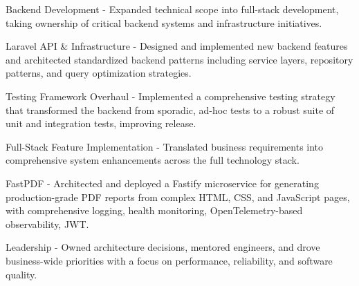 \begin{cventries}
{\begin{cvsubitems}
        \end{cvsubitems}
        \begin{cvitems} %
            \item {Backend Development - Expanded technical scope into full-stack development, taking ownership of critical backend systems and infrastructure initiatives.}
        \end{cvitems}
        \begin{cvsubitems}
            \item {Laravel API \& Infrastructure - Designed and implemented new backend features and architected standardized backend patterns including service layers, repository patterns, and query optimization strategies.}
            \item {Testing Framework Overhaul - Implemented a comprehensive testing strategy that transformed the backend from sporadic, ad-hoc tests to a robust suite of unit and integration tests, improving release.}
            \item {Full-Stack Feature Implementation - Translated business requirements into comprehensive system enhancements across the full technology stack.}
            \item {FastPDF - Architected and deployed a Fastify microservice for generating production-grade PDF reports from complex HTML, CSS, and JavaScript pages, with comprehensive logging, health monitoring, OpenTelemetry-based observability, JWT.}
        \end{cvsubitems}
        \begin{cvitems}
            \item {Leadership - Owned architecture decisions, mentored engineers, and drove business-wide priorities with a focus on performance, reliability, and software quality.}
        \end{cvitems}
    }
\end{cventries}
